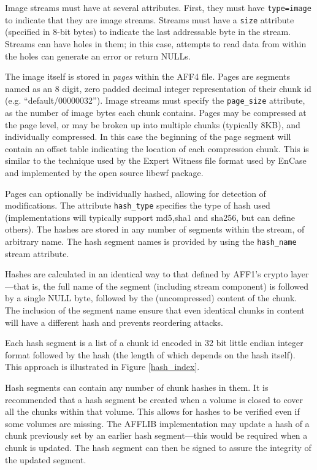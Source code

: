 \documentclass[10pt, conference]{IEEEtran}
\begin{document}
Image streams must have at several attributes. First, they must have
\texttt{type=image} to indicate that they are image streams. Streams
must have a \texttt{size} attribute (specified in 8-bit bytes) to
indicate the last addressable byte in the stream. Streams can have
holes in them; in this case, attempts to read data from within the
holes can generate an error or return NULLs.

The image itself is stored in \emph{pages} within the AFF4 file. Pages are
segments named as an 8 digit, zero padded decimal integer
representation of their chunk id (e.g. ``default/00000032''). Image
streams must specify the \texttt{page\_size} attribute, as the number of
image bytes each chunk contains. Pages may be compressed at the
page level, or may be broken up into multiple chunks (typically 8KB),
and individually compressed. In this case the beginning of the page
segment will contain an offset table indicating the location of each
compression chunk. This is similar to the technique used by the Expert
Witness file format used by EnCase\cite{encase-3.0} and implemented by
the open source libewf\cite{libewf} package.

Pages can optionally be individually hashed, allowing for detection
of modifications. The attribute \texttt{hash\_type} specifies the type of
hash used (implementations will typically support md5,sha1 and sha256, but can
define others). The hashes are stored in any number of segments within
the stream, of arbitrary name. The hash segment names is provided by
using the \texttt{hash\_name} stream attribute.

Hashes are calculated in an identical way to that defined by AFF1's
crypto layer\cite{garfinkel:affcrypto}---that is, the full name of the
segment (including stream component) is followed by a single NULL
byte, followed by the (uncompressed) content of the chunk. The
inclusion of the segment name ensure that even identical chunks in
content will have a different hash and prevents reordering attacks.

Each hash segment is a list of a chunk id encoded in 32 bit
little endian integer format followed by the hash (the length of which
depends on the hash itself). This approach is illustrated in Figure
\ref{hash_index}. 

Hash segments can contain any number of chunk hashes in them. It is
recommended that a hash segment be created when a volume is closed to
cover all the chunks within that volume. This allows for hashes to be
verified even if some volumes are missing. The AFFLIB implementation
may update a hash of a chunk previously set by an earlier hash
segment---this would be required when a chunk is updated. The hash
segment can then be signed to assure the integrity of the updated segment.
\end{document}
